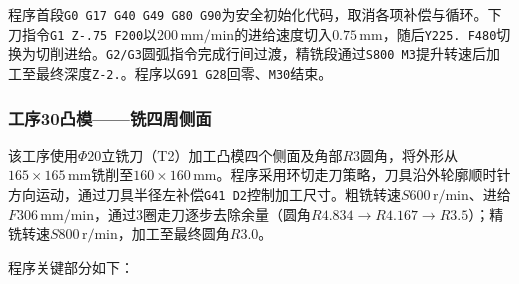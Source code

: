 \documentclass{xautCADreport}
\begin{document}
程序首段\texttt{G0 G17 G40 G49 G80 G90}为安全初始化代码，取消各项补偿与循环。下刀指令\texttt{G1 Z-.75 F200}以$200\,\mathrm{mm/min}$的进给速度切入$0.75\,\mathrm{mm}$，随后\texttt{Y225. F480}切换为切削进给。\texttt{G2/G3}圆弧指令完成行间过渡，精铣段通过\texttt{S800 M3}提升转速后加工至最终深度\texttt{Z-2.}。程序以\texttt{G91 G28}回零、\texttt{M30}结束。

\subsubsection{工序30凸模——铣四周侧面}

该工序使用$\Phi20$立铣刀（T2）加工凸模四个侧面及角部$R3$圆角，将外形从$165\times165\,\mathrm{mm}$铣削至$160\times160\,\mathrm{mm}$。程序采用环切走刀策略，刀具沿外轮廓顺时针方向运动，通过刀具半径左补偿\texttt{G41 D2}控制加工尺寸。粗铣转速$S600\,\mathrm{r/min}$、进给$F306\,\mathrm{mm/min}$，通过3圈走刀逐步去除余量（圆角$R4.834\to R4.167\to R3.5$）；精铣转速$S800\,\mathrm{r/min}$，加工至最终圆角$R3.0$。

程序关键部分如下：
\end{document}
